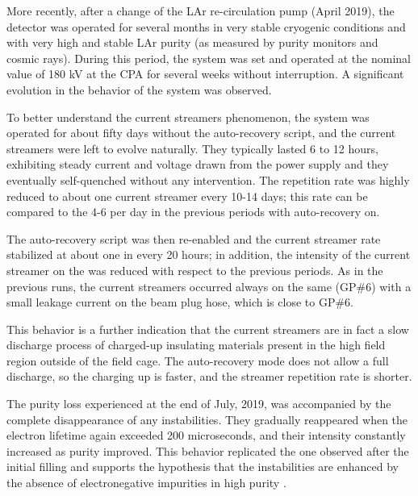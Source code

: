 More recently, after a change of the LAr re-circulation pump (April 2019), the detector was operated for several months in very stable cryogenic conditions and with very high and stable LAr purity (as measured by purity monitors and cosmic rays). During this period, the  system was set and operated at the nominal value of 180 kV at the CPA for several weeks without interruption. A significant evolution in the behavior of the  system was observed. 

To better understand the current streamers phenomenon, the  system was operated for about fifty days without the auto-recovery script, and the current streamers were left to evolve naturally. They typically lasted 6 to 12 hours, exhibiting steady current and voltage drawn from the  power supply and they eventually self-quenched without any intervention. The repetition rate was highly reduced to about one current streamer every 10-14 days; this rate can be compared to the 4-6 per day in the previous periods with auto-recovery on.

The auto-recovery script was then re-enabled and the current streamer rate stabilized at about one in every 20 hours; in addition, the intensity of the current streamer on the  was reduced with respect to the previous periods. As in the previous runs, the current streamers occurred always on the same  (GP\#6) with a small leakage current on the beam plug hose, which is close to GP\#6. 

This behavior is a further indication that the current streamers are in fact a slow discharge process of charged-up insulating materials present in the high field region outside of the field cage. The auto-recovery mode does not allow a full discharge, so the charging up is faster, and the streamer repetition rate is shorter.

The  purity loss experienced at the end of July, 2019, was accompanied by the complete disappearance of any  instabilities. 
They gradually reappeared when the electron lifetime again exceeded 200 microseconds, and their intensity constantly increased as purity improved. This behavior replicated the one observed after the initial filling and supports the hypothesis that the  instabilities are enhanced by the absence of electronegative impurities in high purity .

